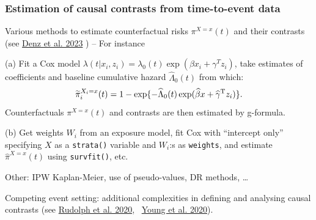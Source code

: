 \documentclass[12pt,dvipsnames,t,aspectratio=169, handout%
]{beamer}
\begin{document}
\begin{frame}
\frametitle{\large Estimation of causal contrasts from time-to-event data}
\bi
\item
Various methods to estimate counterfactual %
risks $\pi^{X=x}(t)$ and their contrasts 
({\small see \href{https://doi.org/10.1002/sim.9681}{\color{blue}Denz et al. 2023} })
\pause
 -- For instance
\medskip
\item[(a)] 
Fit a Cox model $\lambda(t|x_i, z_i) = \lambda_0(t)\exp(\beta x_i + \gamma^{T}z_i)$,
take estimates of coefficients and baseline cumulative hazard $\widehat\Lambda_0(t)$
from which:
$$ %
 \widetilde{\pi}_i^{X_i=x}(t) = 1 - \exp \{ -\widehat\Lambda_0(t)\exp(\widehat\beta x + \widehat\gamma^{\small{\text{T}}} z_i) \}  .
$$ %
Counterfactuals $ {\pi}^{X=x}(t)$ and contrasts are then estimated by g-formula.
\pause
\medskip
\item[(b)]
Get weights $W_i$ from an exposure model, fit Cox with ``intercept only'' 
specifying $X$ as a \texttt{strata()} variable and $W_i$:s as \texttt{weights}, and estimate $\widehat{\pi}^{X=x}(t)$
using \texttt{survfit()}, etc.
\pause
\medskip
\item Other: IPW Kaplan-Meier, use of pseudo-values, DR methods, \dots
\medskip
\item Competing event setting: additional complexities in defining and analysing causal contrasts
({\small see \href{https://doi.org/10.1007/s40471-020-00240-7}{\color{blue}Rudolph et al. 2020}, \ 
\href{https://doi.org/10.1002/sim.8471}{\color{blue}Young et al. 2020}}).    
\ei
\end{frame}
\end{document}
